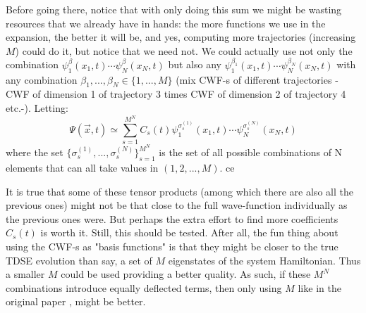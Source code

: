 \documentclass[11pt, a4paper]{article} %
\begin{document}
Before going there, notice that with only doing this sum we might be wasting resources that we already have in hands: the more functions we use in the expansion, the better it will be, and yes, computing more trajectories (increasing $M$) could do it, but notice that we need not. We could actually use not only the combination $\psi^\beta_1(x_1,t)\cdots \psi^\beta_N(x_N,t)$ but also any $\psi^{\beta_1}_1(x_1,t)\cdots \psi^{\beta_N}_N(x_N,t)$ with any combination $\beta_1,...,\beta_N \in \{1,...,M\}$ (mix CWF-s of different trajectories -CWF of dimension 1 of trajectory 3 times CWF of dimension 2 of trajectory 4 etc.-). Letting:
\begin{equation}\label{CWF.LinComb}\tag{CWF.LinComb}
\Psi(\vec{x},t)\simeq \sum_{s=1}^{M^N} C_s(t) \psi_1^{\sigma^{(1)}_s}(x_1,t)\cdots \psi_N^{\sigma^{(N)}_s}(x_N,t)
\end{equation}
where the set $\{\sigma^{(1)}_s, ..., \sigma^{(N)}_s\}_{s=1}^{M^N}$ is the set of all possible combinations of N elements that can all take values in $(1,2,..., M)$. ce

It is true that some of these tensor products (among which there are also all the previous ones) might not be that close to the full wave-function individually as the previous ones were. But perhaps the extra effort to find more coefficients $C_s(t)$ is worth it. Still, this should be tested. After all, the fun thing about using the CWF-s as "basis functions" is that they might be closer to the true TDSE evolution than say, a set of $M$ eigenstates of the system Hamiltonian. Thus a smaller $M$ could be used providing a better quality. As such, if these $M^N$ combinations introduce equally deflected terms, then only using $M$ like in the original paper \cite{Albareda}, might be better.
\end{document}
